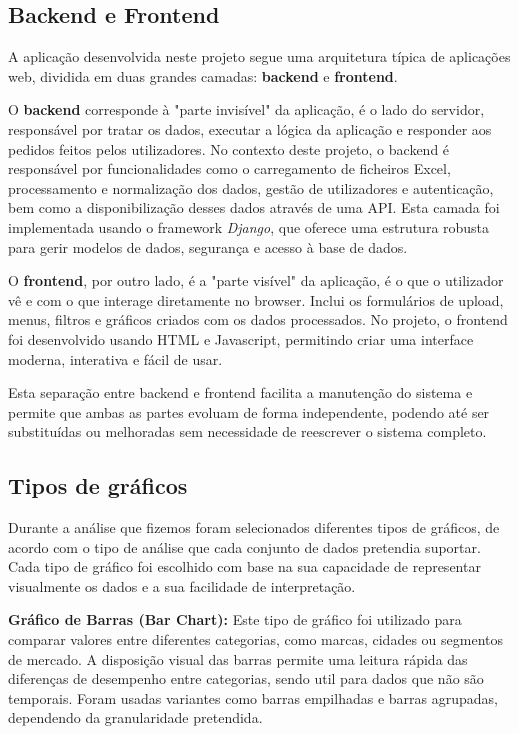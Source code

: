 \subsection{Backend e Frontend}

A aplicação desenvolvida neste projeto segue uma arquitetura típica de aplicações web, dividida em duas grandes camadas: \textbf{backend} e \textbf{frontend}.

O \textbf{backend} corresponde à "parte invisível" da aplicação,  é o lado do servidor, responsável por tratar os dados, executar a lógica da aplicação e responder aos pedidos feitos pelos utilizadores. No contexto deste projeto, o backend é responsável por funcionalidades como o carregamento de ficheiros Excel, processamento e normalização dos dados, gestão de utilizadores e autenticação, bem como a disponibilização desses dados através de uma API. Esta camada foi implementada usando o framework \textit{Django}, que oferece uma estrutura robusta para gerir modelos de dados, segurança e acesso à base de dados.

O \textbf{frontend}, por outro lado, é a "parte visível" da aplicação, é o que o utilizador vê e com o que interage diretamente no browser. Inclui os formulários de upload, menus, filtros e gráficos criados com os dados processados. No projeto, o frontend foi desenvolvido usando HTML e Javascript, permitindo criar uma interface moderna, interativa e fácil de usar.

Esta separação entre backend e frontend facilita a manutenção do sistema e permite que ambas as partes evoluam de forma independente, podendo até ser substituídas ou melhoradas sem necessidade de reescrever o sistema completo.


\subsection{Tipos de gráficos}

Durante a análise que fizemos foram selecionados diferentes tipos de gráficos, de acordo com o tipo de análise que cada conjunto de dados pretendia suportar. Cada tipo de gráfico foi escolhido com base na sua capacidade de representar visualmente os dados e a sua facilidade de interpretação.

\textbf{Gráfico de Barras (Bar Chart):}
Este tipo de gráfico foi utilizado para comparar valores entre diferentes categorias, como marcas, cidades ou segmentos de mercado. A disposição visual das barras permite uma leitura rápida das diferenças de desempenho entre categorias, sendo util para dados que não são temporais. Foram usadas variantes como barras empilhadas e barras agrupadas, dependendo da granularidade pretendida.

